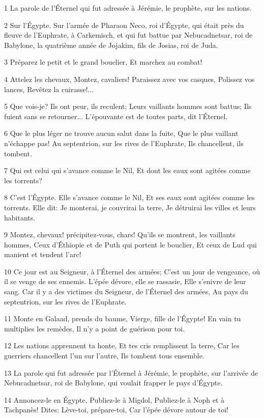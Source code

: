 \par 1 La parole de l'Éternel qui fut adressée à Jérémie, le prophète, sur les nations.
\par 2 Sur l'Égypte. Sur l'armée de Pharaon Neco, roi d'Égypte, qui était près du fleuve de l'Euphrate, à Carkemisch, et qui fut battue par Nebucadnetsar, roi de Babylone, la quatrième année de Jojakim, fils de Josias, roi de Juda.
\par 3 Préparez le petit et le grand bouclier, Et marchez au combat!
\par 4 Attelez les chevaux, Montez, cavaliers! Paraissez avec vos casques, Polissez vos lances, Revêtez la cuirasse!...
\par 5 Que vois-je? Ils ont peur, ils reculent; Leurs vaillants hommes sont battus; Ils fuient sans se retourner... L'épouvante est de toutes parts, dit l'Éternel.
\par 6 Que le plus léger ne trouve aucun salut dans la fuite, Que le plus vaillant n'échappe pas! Au septentrion, sur les rives de l'Euphrate, Ils chancellent, ils tombent.
\par 7 Qui est celui qui s'avance comme le Nil, Et dont les eaux sont agitées comme les torrents?
\par 8 C'est l'Égypte. Elle s'avance comme le Nil, Et ses eaux sont agitées comme les torrents. Elle dit: Je monterai, je couvrirai la terre, Je détruirai les villes et leurs habitants.
\par 9 Montez, chevaux! précipitez-vous, chars! Qu'ils se montrent, les vaillants hommes, Ceux d'Éthiopie et de Puth qui portent le bouclier, Et ceux de Lud qui manient et tendent l'arc!
\par 10 Ce jour est au Seigneur, à l'Éternel des armées; C'est un jour de vengeance, où il se venge de ses ennemis. L'épée dévore, elle se rassasie, Elle s'enivre de leur sang. Car il y a des victimes du Seigneur, de l'Éternel des armées, Au pays du septentrion, sur les rives de l'Euphrate.
\par 11 Monte en Galaad, prends du baume, Vierge, fille de l'Égypte! En vain tu multiplies les remèdes, Il n'y a point de guérison pour toi.
\par 12 Les nations apprennent ta honte, Et tes cris remplissent la terre, Car les guerriers chancellent l'un sur l'autre, Ils tombent tous ensemble.
\par 13 La parole qui fut adressée par l'Éternel à Jérémie, le prophète, sur l'arrivée de Nebucadnetsar, roi de Babylone, qui voulait frapper le pays d'Égypte.
\par 14 Annoncez-le en Égypte, Publiez-le à Migdol, Publiez-le à Noph et à Tachpanès! Dites: Lève-toi, prépare-toi, Car l'épée dévore autour de toi!
